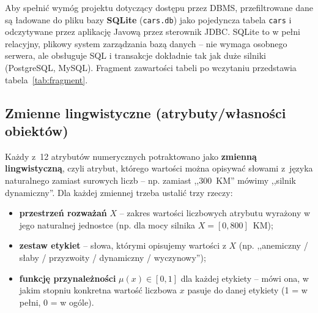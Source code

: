 \documentclass{article}
\begin{document}
Aby spełnić wymóg projektu dotyczący dostępu przez DBMS, przefiltrowane
dane są ładowane do pliku bazy \textbf{SQLite} (\texttt{cars.db}) jako
pojedyncza tabela \texttt{cars} i odczytywane przez aplikację Javową
przez sterownik JDBC. SQLite to w pełni relacyjny, plikowy system
zarządzania bazą danych -- nie wymaga osobnego serwera, ale obsługuje
SQL i transakcje dokładnie tak jak duże silniki (PostgreSQL, MySQL).
Fragment zawartości tabeli po wczytaniu przedstawia
tabela~\ref{tab:fragment}.

\begin{table}[H]
\centering
\caption{Fragment podzbioru roboczego (5 z 23\,441 rekordów). Kolumny
zostały skrócone do najważniejszych atrybutów dla zachowania czytelności;
pełny zestaw 15 atrybutów -- tabela~\ref{tab:atrybuty}. Wartości
przepisane bez modyfikacji ze zbioru źródłowego.}
\label{tab:fragment}
\end{table}

\subsection{Zmienne lingwistyczne (atrybuty/własności obiektów)}
\label{sec:zmienne}

Każdy z~12 atrybutów numerycznych potraktowano jako \textbf{zmienną
lingwistyczną}, czyli atrybut, którego wartości można opisywać słowami
z~języka naturalnego zamiast surowych liczb -- np. zamiast ,,300~KM''
mówimy ,,silnik dynamiczny''. Dla każdej zmiennej trzeba ustalić trzy
rzeczy:
\begin{itemize}
    \item \textbf{przestrzeń rozważań} $X$ -- zakres wartości liczbowych
    atrybutu wyrażony w jego naturalnej jednostce (np. dla mocy silnika
    $X = [0, 800]$~KM);
    \item \textbf{zestaw etykiet} -- słowa, którymi opisujemy wartości
    z $X$ (np. ,,anemiczny / słaby / przyzwoity / dynamiczny / wyczynowy'');
    \item \textbf{funkcję przynależności} $\mu(x) \in [0, 1]$ dla każdej
    etykiety -- mówi ona, w jakim stopniu konkretna wartość liczbowa
    $x$ pasuje do danej etykiety (1 = w pełni, 0 = w ogóle).
\end{itemize}
\end{document}
